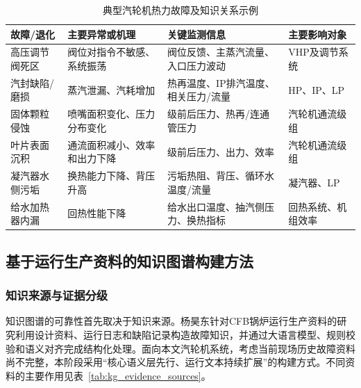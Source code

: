 \begin{table}[htbp]
\centering
\caption{典型汽轮机热力故障及知识关系示例}
\label{tab:turbine_fault_knowledge_examples}
\begin{tabular}{p{2.7cm}p{3.7cm}p{4.2cm}p{3.3cm}}
\toprule
故障/退化 & 主要异常或机理 & 关键监测信息 & 主要影响对象 \\
\midrule
高压调节阀死区 & 阀位对指令不敏感、系统振荡 & 阀位反馈、主蒸汽流量、入口压力波动 & VHP及调节系统 \\
汽封缺陷/磨损 & 蒸汽泄漏、汽耗增加 & 热再温度、IP排汽温度、相关压力/流量 & HP、IP、LP \\
固体颗粒侵蚀 & 喷嘴面积变化、压力分布变化 & 级前后压力、热再/连通管压力 & 汽轮机通流级组 \\
叶片表面沉积 & 通流面积减小、效率和出力下降 & 级前后压力、出力、效率 & 汽轮机通流级组 \\
凝汽器水侧污垢 & 换热能力下降、背压升高 & 污垢热阻、背压、循环水温度/流量 & 凝汽器、LP \\
给水加热器内漏 & 回热性能下降 & 给水出口温度、抽汽侧压力、换热指标 & 回热系统、机组效率 \\
\bottomrule
\end{tabular}
\end{table}

\subsection{基于运行生产资料的知识图谱构建方法}
\label{subsec:kg_construction_method_v2}

\subsubsection{知识来源与证据分级}

知识图谱的可靠性首先取决于知识来源。杨昊东针对CFB锅炉运行生产资料的研究利用设计资料、运行日志和缺陷记录构造故障知识，并通过大语言模型、规则校验和语义对齐完成结构化处理\cite{YangHaodong2026CFB}。面向本文汽轮机系统，考虑当前现场历史故障资料尚不完整，本阶段采用“核心语义层先行、运行文本持续扩展”的构建方式。不同资料的主要作用见表~\ref{tab:kg_evidence_sources}。

